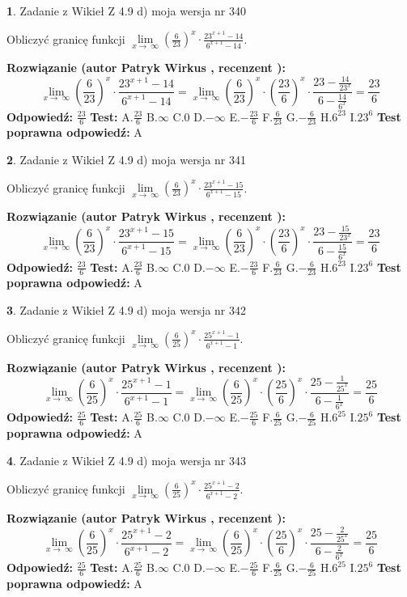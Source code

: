 \documentclass[12pt, a4paper]{article}
\theoremstyle{definition} %
\newtheorem{zad}{}
\newcommand{\zadStart}[1]{\begin{zad}#1\newline}
\newcommand{\zadStop}{\end{zad}}
\newcommand{\rozwStart}[2]{\noindent \textbf{Rozwiązanie (autor #1 , recenzent #2): }\newline}
\newcommand{\rozwStop}{\newline}
\newcommand{\odpStart}{\noindent \textbf{Odpowiedź:}\newline}
\newcommand{\odpStop}{\newline}
\newcommand{\testStart}{\noindent \textbf{Test:}\newline}
\newcommand{\testStop}{\newline}
\newcommand{\kluczStart}{\noindent \textbf{Test poprawna odpowiedź:}\newline}
\newcommand{\kluczStop}{\newline}
\begin{document}
\zadStart{Zadanie z Wikieł Z 4.9 d) moja wersja nr 340}


Obliczyć granicę funkcji  $\lim\limits_{x\to\ \infty}(\frac{6}{23})^{x}\cdot\frac{23^{x+1}-14}{6^{x+1}-14}$.
\zadStop
\rozwStart{Patryk Wirkus}{}
$$\lim\limits_{x\to\ \infty}(\frac{6}{23})^{x}\cdot\frac{23^{x+1}-14}{6^{x+1}-14}=\lim\limits_{x\to\ \infty}(\frac{6}{23})^{x}\cdot(\frac{23}{6})^{x} \cdot \frac{23-\frac{14}{23^{x}}}{6-\frac{14}{6^{x}}} = \frac{23}{6}$$
\rozwStop
\odpStart
$\frac{23}{6}$
\odpStop
\testStart
A.$\frac{23}{6}$ B.$\infty$ C.$0$ D.$-\infty$ E.$-\frac{23}{6}$
F.$\frac{6}{23}$ G.$-\frac{6}{23}$
H.$6^{23}$
I.$23^{6}$
\testStop
\kluczStart
A
\kluczStop



\zadStart{Zadanie z Wikieł Z 4.9 d) moja wersja nr 341}


Obliczyć granicę funkcji  $\lim\limits_{x\to\ \infty}(\frac{6}{23})^{x}\cdot\frac{23^{x+1}-15}{6^{x+1}-15}$.
\zadStop
\rozwStart{Patryk Wirkus}{}
$$\lim\limits_{x\to\ \infty}(\frac{6}{23})^{x}\cdot\frac{23^{x+1}-15}{6^{x+1}-15}=\lim\limits_{x\to\ \infty}(\frac{6}{23})^{x}\cdot(\frac{23}{6})^{x} \cdot \frac{23-\frac{15}{23^{x}}}{6-\frac{15}{6^{x}}} = \frac{23}{6}$$
\rozwStop
\odpStart
$\frac{23}{6}$
\odpStop
\testStart
A.$\frac{23}{6}$ B.$\infty$ C.$0$ D.$-\infty$ E.$-\frac{23}{6}$
F.$\frac{6}{23}$ G.$-\frac{6}{23}$
H.$6^{23}$
I.$23^{6}$
\testStop
\kluczStart
A
\kluczStop



\zadStart{Zadanie z Wikieł Z 4.9 d) moja wersja nr 342}


Obliczyć granicę funkcji  $\lim\limits_{x\to\ \infty}(\frac{6}{25})^{x}\cdot\frac{25^{x+1}-1}{6^{x+1}-1}$.
\zadStop
\rozwStart{Patryk Wirkus}{}
$$\lim\limits_{x\to\ \infty}(\frac{6}{25})^{x}\cdot\frac{25^{x+1}-1}{6^{x+1}-1}=\lim\limits_{x\to\ \infty}(\frac{6}{25})^{x}\cdot(\frac{25}{6})^{x} \cdot \frac{25-\frac{1}{25^{x}}}{6-\frac{1}{6^{x}}} = \frac{25}{6}$$
\rozwStop
\odpStart
$\frac{25}{6}$
\odpStop
\testStart
A.$\frac{25}{6}$ B.$\infty$ C.$0$ D.$-\infty$ E.$-\frac{25}{6}$
F.$\frac{6}{25}$ G.$-\frac{6}{25}$
H.$6^{25}$
I.$25^{6}$
\testStop
\kluczStart
A
\kluczStop



\zadStart{Zadanie z Wikieł Z 4.9 d) moja wersja nr 343}


Obliczyć granicę funkcji  $\lim\limits_{x\to\ \infty}(\frac{6}{25})^{x}\cdot\frac{25^{x+1}-2}{6^{x+1}-2}$.
\zadStop
\rozwStart{Patryk Wirkus}{}
$$\lim\limits_{x\to\ \infty}(\frac{6}{25})^{x}\cdot\frac{25^{x+1}-2}{6^{x+1}-2}=\lim\limits_{x\to\ \infty}(\frac{6}{25})^{x}\cdot(\frac{25}{6})^{x} \cdot \frac{25-\frac{2}{25^{x}}}{6-\frac{2}{6^{x}}} = \frac{25}{6}$$
\rozwStop
\odpStart
$\frac{25}{6}$
\odpStop
\testStart
A.$\frac{25}{6}$ B.$\infty$ C.$0$ D.$-\infty$ E.$-\frac{25}{6}$
F.$\frac{6}{25}$ G.$-\frac{6}{25}$
H.$6^{25}$
I.$25^{6}$
\testStop
\kluczStart
A
\kluczStop
\end{document}

